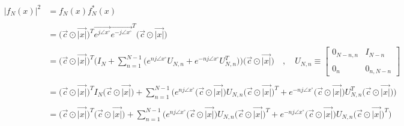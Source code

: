 \documentclass{article}
\begin{document}
\begin{align*}
    \Big|f_{N}(x)\Big|^{2}&= f_{N}(x)f^{*}_{N}(x) \\ \\
                          &= \Big(\vec{c} \odot \vec{|x|}\Big)^{T}\vec{e^{j\angle{x}^{\circ}}}\vec{e^{-j\angle{x}^{\circ}}}^{T}\Big(\vec{c} \odot \vec{|x|}\Big) \\ \\
                          &= \Big(\vec{c} \odot \vec{|x|}\Big)^{T}\Bigg(I_{N} + \sum_{n=1}^{N - 1}\Big(e^{nj\angle{x}^{\circ}}U_{N, n} + e^{-nj\angle{x}^{\circ}}U_{N, n}^{T}\Big)\Bigg)\Big(\vec{c} \odot \vec{|x|}\Big) \quad , \quad U_{N, n} \equiv \begin{bmatrix}
                                                                                                                                                                                                                                                            0_{N - n, n} & I_{N - n} \\ \\
                                                                                                                                                                                                                                                            0_{n} & 0_{n, N - n}
                                                                                                                                                                                                                                                          \end{bmatrix} \\ \\
                          &= \Big(\vec{c} \odot \vec{|x|}\Big)^{T}I_{N}\Big(\vec{c} \odot \vec{|x|}\Big) + \sum_{n=1}^{N - 1}\Bigg(e^{nj\angle{x}^{\circ}}\Big(\vec{c} \odot \vec{|x|}\Big)U_{N, n}\Big(\vec{c} \odot \vec{|x|}\Big)^{T} + e^{-nj\angle{x}^{\circ}}\Big(\vec{c} \odot \vec{|x|}\Big)U_{N, n}^{T}\Big(\vec{c} \odot \vec{|x|}\Big)\Bigg) \\ \\
                          &= \Big(\vec{c} \odot \vec{|x|}\Big)^{T}\Big(\vec{c} \odot \vec{|x|}\Big) + \sum_{n=1}^{N - 1}\Bigg(e^{nj\angle{x}^{\circ}}\Big(\vec{c} \odot \vec{|x|}\Big)U_{N, n}\Big(\vec{c} \odot \vec{|x|}\Big)^{T} + e^{-nj\angle{x}^{\circ}}\Big(\vec{c} \odot \vec{|x|}\Big)U_{N, n}\Big(\vec{c} \odot \vec{|x|}\Big)^{T}\Bigg) \\ \\

\end{align*}
\end{document}
